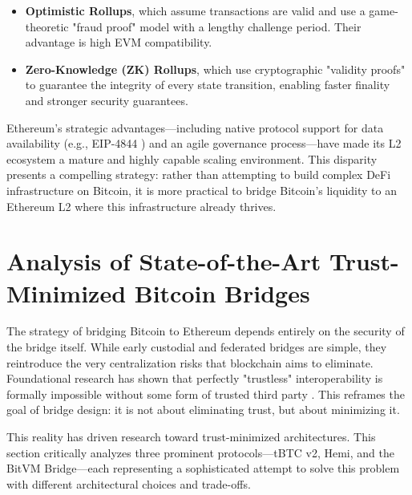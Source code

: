 \documentclass{DESSThesis}
\begin{document}
\begin{itemize}
    \item \textbf{Optimistic Rollups}, which assume transactions are valid and use a game-theoretic "fraud proof" model with a lengthy challenge period. Their advantage is high EVM compatibility.
    \item \textbf{Zero-Knowledge (ZK) Rollups}, which use cryptographic "validity proofs" to guarantee the integrity of every state transition, enabling faster finality and stronger security guarantees.
\end{itemize}
Ethereum's strategic advantages—including native protocol support for data availability (e.g., EIP-4844 \cite{proposals_eip-4844_nodate,park_impact_2024}) and an agile governance process—have made its L2 ecosystem a mature and highly capable scaling environment. This disparity presents a compelling strategy: rather than attempting to build complex DeFi infrastructure on Bitcoin, it is more practical to bridge Bitcoin's liquidity to an Ethereum L2 where this infrastructure already thrives.

\section{Analysis of State-of-the-Art Trust-Minimized Bitcoin Bridges}
The strategy of bridging Bitcoin to Ethereum depends entirely on the security of the bridge itself. While early custodial and federated bridges are simple, they reintroduce the very centralization risks that blockchain aims to eliminate. Foundational research has shown that perfectly "trustless" interoperability is formally impossible without some form of trusted third party \cite{zamyatin_sok_2019}. This reframes the goal of bridge design: it is not about eliminating trust, but about minimizing it.

This reality has driven research toward trust-minimized architectures. This section critically analyzes three prominent protocols—tBTC v2, Hemi, and the BitVM Bridge—each representing a sophisticated attempt to solve this problem with different architectural choices and trade-offs.
\end{document}
